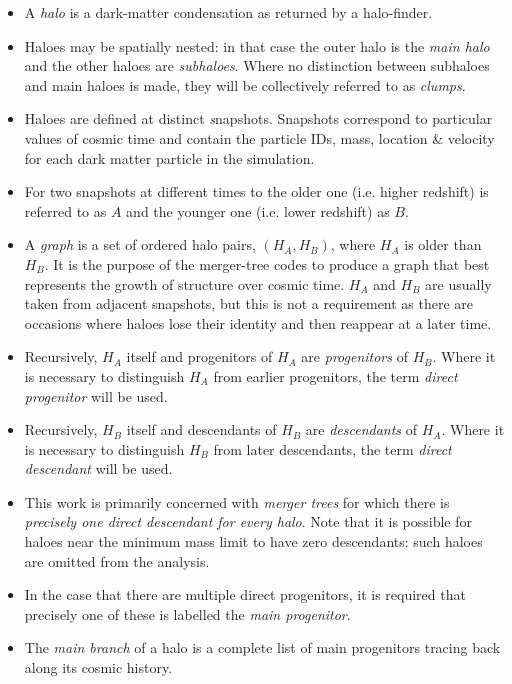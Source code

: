\begin{itemize}
	\item A \emph{halo} is a dark-matter condensation as returned by a halo-finder.
	
	\item Haloes may be spatially nested: in that case the outer halo is the \emph{main halo} and the other haloes are	\emph{subhaloes}.
		Where no distinction between subhaloes and main haloes is made, they will be collectively referred to as \emph{clumps}.
	
	\item Haloes are defined at distinct {\emph snapshots}. 
		Snapshots correspond to	particular values of cosmic time and contain the particle IDs, mass, location \& velocity for each dark matter particle in the simulation.  
	
	\item For two snapshots at different times to the older one (i.e. higher redshift) is referred to as $A$ and the younger one (i.e. lower redshift) as $B$.
	
	\item A \emph{graph} is a set of ordered halo pairs, $(H_A,H_B)$, where $H_A$ is older than $H_B$. 
		It is the purpose of the merger-tree codes to produce a graph that best represents the growth of structure over cosmic time.
		$H_A$ and $H_B$ are usually taken from adjacent snapshots, but this is not a requirement as there are occasions where haloes lose their identity and then reappear at a later time.
	
	\item Recursively, $H_A$ itself and progenitors of $H_A$ are \emph{progenitors} of $H_B$.
		Where it is necessary to distinguish $H_A$ from earlier progenitors, the term \emph{direct progenitor} will be used.
	
	\item Recursively, $H_B$ itself and descendants of $H_B$ are \emph{descendants} of $H_A$.  
		Where it is necessary to distinguish $H_B$ from later descendants, the term \emph{direct descendant} will be used.
	
	\item This work is primarily concerned with \emph{merger trees} for
	which there is \emph{precisely one direct descendant for every halo}. 
		Note that it is possible for haloes near the minimum mass limit to have zero descendants: such haloes are omitted from the analysis.
	
	\item In the case that there are multiple direct progenitors, it is required that precisely one of these is labelled the \emph{ main progenitor}.
	
	\item The \emph{main branch} of a halo is a complete list of main progenitors tracing back along its cosmic history.
	
\end{itemize}








